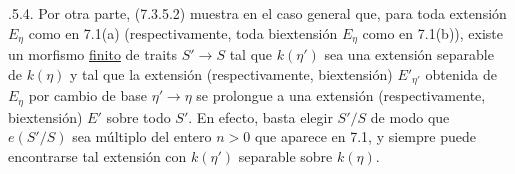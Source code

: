\smallskip
{}.5.4. Por otra parte, (7.3.5.2) muestra en el caso general
que, para toda extensión $E_\eta$ como en 7.1(a) (respectivamente, toda
biextensión $E_\eta$ como en 7.1(b)), existe un morfismo
\underline{finito} de traits $S'\to S$ tal que $k(\eta')$ sea una
extensión separable de $k(\eta)$ y tal que la extensión
(respectivamente, biextensión) $E'_{\eta'}$ obtenida de $E_\eta$ por
cambio de base $\eta'\to\eta$ se prolongue a una extensión
(respectivamente, biextensión) $E'$ sobre todo $S'$. En efecto, basta
elegir $S'/S$ de modo que $e(S'/S)$ sea múltiplo del entero $n>0$ que
aparece en 7.1, y siempre puede encontrarse tal extensión con
$k(\eta')$ separable sobre $k(\eta)$.

